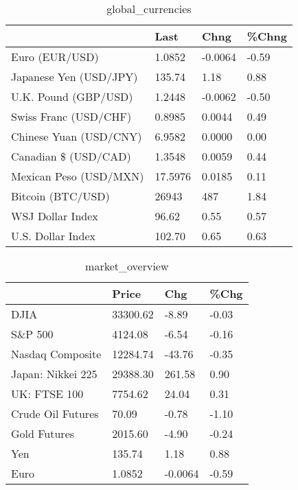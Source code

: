 \documentclass{article}%
\begin{document}
%


\begin{table}[htbp]%
\caption{global\_currencies}%
\centering%
\begin{adjustbox}{width=1\textwidth}%
\begin{tabular}{llll}
\toprule
                       &    Last &    Chng & \%Chng \\
\midrule
        Euro (EUR/USD) &  1.0852 & -0.0064 & -0.59 \\
Japanese Yen (USD/JPY) &  135.74 &    1.18 &  0.88 \\
  U.K. Pound (GBP/USD) &  1.2448 & -0.0062 & -0.50 \\
 Swiss Franc (USD/CHF) &  0.8985 &  0.0044 &  0.49 \\
Chinese Yuan (USD/CNY) &  6.9582 &  0.0000 &  0.00 \\
  Canadian \$ (USD/CAD) &  1.3548 &  0.0059 &  0.44 \\
Mexican Peso (USD/MXN) & 17.5976 &  0.0185 &  0.11 \\
     Bitcoin (BTC/USD) &   26943 &     487 &  1.84 \\
      WSJ Dollar Index &   96.62 &    0.55 &  0.57 \\
     U.S. Dollar Index &  102.70 &    0.65 &  0.63 \\
\bottomrule
\end{tabular}
%
\end{adjustbox}%
\end{table}

%


\begin{table}[htbp]%
\caption{market\_overview}%
\centering%
\begin{adjustbox}{width=1\textwidth}%
\begin{tabular}{llll}
\toprule
                  &    Price &     Chg &  \%Chg \\
\midrule
             DJIA & 33300.62 &   -8.89 & -0.03 \\
          S\&P 500 &  4124.08 &   -6.54 & -0.16 \\
 Nasdaq Composite & 12284.74 &  -43.76 & -0.35 \\
Japan: Nikkei 225 & 29388.30 &  261.58 &  0.90 \\
     UK: FTSE 100 &  7754.62 &   24.04 &  0.31 \\
Crude Oil Futures &    70.09 &   -0.78 & -1.10 \\
     Gold Futures &  2015.60 &   -4.90 & -0.24 \\
              Yen &   135.74 &    1.18 &  0.88 \\
             Euro &   1.0852 & -0.0064 & -0.59 \\
\bottomrule
\end{tabular}
%
\end{adjustbox}%
\end{table}

%
\end{document}
